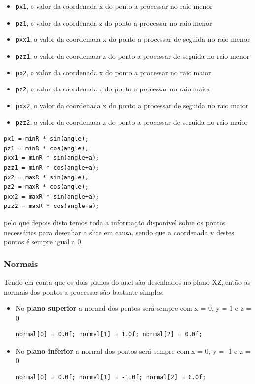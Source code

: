 \documentclass{article}
\begin{document}
\begin{itemize}
	\item \texttt{px1}, o valor da coordenada x do ponto a processar no raio menor
	\item \texttt{pz1}, o valor da coordenada z do ponto a processar no raio menor
	\item \texttt{pxx1}, o valor da coordenada x do ponto a processar de seguida no raio menor
	\item \texttt{pzz1}, o valor da coordenada z do ponto a processar de seguida no raio menor
	\item \texttt{px2}, o valor da coordenada x do ponto a processar no raio maior
	\item \texttt{pz2}, o valor da coordenada z do ponto a processar no raio maior
	\item \texttt{pxx2}, o valor da coordenada x do ponto a processar de seguida no raio maior
	\item \texttt{pzz2}, o valor da coordenada z do ponto a processar de seguida no raio maior
\end{itemize}

\begin{verbatim}
px1 = minR * sin(angle);
pz1 = minR * cos(angle);
pxx1 = minR * sin(angle+a);
pzz1 = minR * cos(angle+a);
px2 = maxR * sin(angle);
pz2 = maxR * cos(angle);
pxx2 = maxR * sin(angle+a);
pzz2 = maxR * cos(angle+a);
\end{verbatim}

pelo que depois disto temos toda a informação disponível sobre os pontos necessários para desenhar a slice em causa, sendo que a coordenada y destes pontos é sempre igual a 0.

\subsubsection{Normais}
Tendo em conta que os dois planos do anel são desenhados no plano XZ, então as normais dos pontos a processar são bastante simples:

\begin{itemize}
	\item No \textbf{plano superior} a normal dos pontos será sempre com x = 0, y = 1 e z = 0
	\begin{verbatim}
normal[0] = 0.0f; normal[1] = 1.0f; normal[2] = 0.0f;
	\end{verbatim}
	\item No \textbf{plano inferior} a normal dos pontos será sempre com x = 0, y = -1 e z = 0
	\begin{verbatim}
normal[0] = 0.0f; normal[1] = -1.0f; normal[2] = 0.0f;
	\end{verbatim}
\end{itemize}
\end{document}
